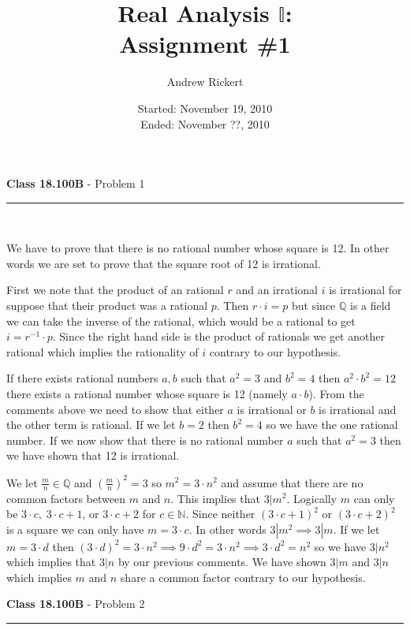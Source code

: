 \documentclass[11pt,reqno]{article}
\title{Real Analysis $\mathbb{I}$: \\ Assignment \#1}
\author{Andrew Rickert}
\date{Started: November 19, 2010 \\ \hspace{1pt} Ended: November ??, 2010}                                           %
\begin{document}
\maketitle


\begin{flushleft} 
\textbf{Class 18.100B} - Problem 1\\
\rule{500pt}{1pt}\\
\end{flushleft} 
	We have to prove that there is no rational number whose square is 12. In other words we are set to prove that the square root of 12 is irrational. 
	
First we note that the product of an rational $r$ and an irrational $i$ is irrational for suppose that their product was a rational $p$. Then $r \cdot i = p$ but since $\mathbb{Q}$ is a field we can take the inverse of the rational, which would be a rational to get $i = r^{-1} \cdot p$. Since the right hand side is the product of rationals we get another rational which implies the rationality of $i$ contrary to our hypothesis. 

If there exists rational numbers $a, b$ such that $a^2 = 3$ and $b^2 = 4$ then $a^2 \cdot b^2 = 12$ there exists a rational number whose square is 12 (namely $a \cdot b$). From the comments above we need to show that either $a$ is irrational or $b$ is irrational and the other term is rational. If we let $b = 2$ then $b^2 = 4$ so we have the one rational number. If we now show that there is no rational number $a$ such that $a^2 = 3$ then we have shown that 12 is irrational.

We let $\frac{m}{n} \in \mathbb{Q}$ and   $(\frac{m}{n})^2 = 3$ so $m^2 = 3 \cdot n^2$ and assume that there are no common factors between $m$ and $n$. This implies that $3|m^2$. Logically $m$ can only be $3\cdot c, \; 3 \cdot c + 1$, or $3 \cdot c + 2$ for $c \in \mathbb{N}$. Since neither $(3 \cdot c + 1)^2$ or $(3 \cdot c + 2)^2$ is a square we can only have $m = 3 \cdot c$. In other words $3|m^2 \implies 3|m$. If we let $m = 3 \cdot d$ then $(3 \cdot d)^2 = 3 \cdot n^2 \implies 9 \cdot d^2 = 3 \cdot n^2 \implies 3 \cdot d^2 = n^2$ so we have $3|n^2$ which implies that $3|n$ by our previous comments. We have shown $3|m$ and $3|n$ which implies $m$ and $n$ share a common factor contrary to our hypothesis.

\vspace{15pt}
\begin{flushleft} 
\textbf{Class 18.100B} - Problem 2\\
\rule{500pt}{1pt}\\
\end{flushleft} 
\end{document}
